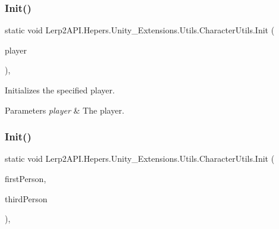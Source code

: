 \subsubsection{\texorpdfstring{Init()}{Init()}\hspace{0.1cm}{\footnotesize\ttfamily [1/2]}}
{\footnotesize\ttfamily static void Lerp2\+A\+P\+I.\+Hepers.\+Unity\+\_\+\+Extensions.\+Utils.\+Character\+Utils.\+Init (\begin{DoxyParamCaption}\item[{Transform}]{player }\end{DoxyParamCaption})\hspace{0.3cm}{\ttfamily [inline]}, {\ttfamily [static]}}



Initializes the specified player. 


\begin{DoxyParams}{Parameters}
{\em player} & The player.\\
\hline
\end{DoxyParams}
\mbox{\label{class_lerp2_a_p_i_1_1_hepers_1_1_unity___extensions_1_1_utils_1_1_character_utils_ae9dbd4755dcc129539320789dc15a52b}} 
\subsubsection{\texorpdfstring{Init()}{Init()}\hspace{0.1cm}{\footnotesize\ttfamily [2/2]}}
{\footnotesize\ttfamily static void Lerp2\+A\+P\+I.\+Hepers.\+Unity\+\_\+\+Extensions.\+Utils.\+Character\+Utils.\+Init (\begin{DoxyParamCaption}\item[{Game\+Object}]{first\+Person,  }\item[{Game\+Object}]{third\+Person }\end{DoxyParamCaption})\hspace{0.3cm}{\ttfamily [inline]}, {\ttfamily [static]}}



